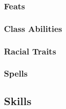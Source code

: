 \documentclass[10pt]{article}
\begin{document}
	\subsubsection*{Feats}
		\feats
	\subsubsection*{Class Abilities}
		\classab
	\subsubsection*{Racial Traits}
		\racetr
	\subsubsection*{Spells}
		\spells

%
%

\subsection*{Skills} 
\end{document}

